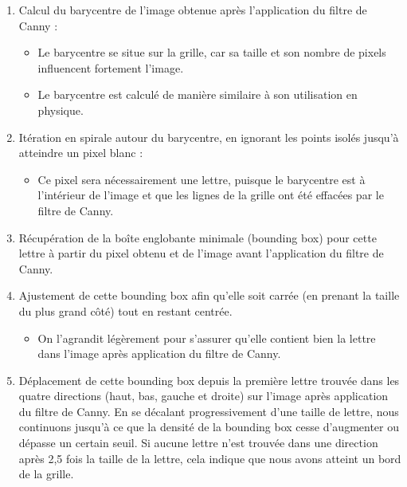 \begin{enumerate}
    \item \noindent Calcul du barycentre de l'image obtenue après l'application du filtre de Canny : 
    \begin{itemize}
        \item \noindent Le barycentre se situe sur la grille, car sa taille et son nombre de pixels influencent fortement l'image.
        \item \noindent Le barycentre est calculé de manière similaire à son utilisation en physique.
    \end{itemize}

    \item \noindent Itération en spirale autour du barycentre, en ignorant les points isolés jusqu'à atteindre un pixel blanc :
    \begin{itemize}
        \item \noindent Ce pixel sera nécessairement une lettre, puisque le barycentre est à l'intérieur de l'image et que les lignes de la grille ont été effacées par le filtre de Canny.
    \end{itemize}

    \item \noindent Récupération de la boîte englobante minimale (bounding box) pour cette lettre à partir du pixel obtenu et de l'image avant l'application du filtre de Canny.

    \item \noindent Ajustement de cette bounding box afin qu'elle soit carrée (en prenant la taille du plus grand côté) tout en restant centrée.
    \begin{itemize}
        \item \noindent On l'agrandit légèrement pour s'assurer qu'elle contient bien la lettre dans l'image après application du filtre de Canny.
    \end{itemize}

    \item \noindent Déplacement de cette bounding box depuis la première lettre trouvée dans les quatre directions (haut, bas, gauche et droite) sur l'image après application du filtre de Canny. En se décalant progressivement d'une taille de lettre, nous continuons jusqu'à ce que la densité de la bounding box cesse d'augmenter ou dépasse un certain seuil. Si aucune lettre n'est trouvée dans une direction après 2,5 fois la taille de la lettre, cela indique que nous avons atteint un bord de la grille.


\end{enumerate}
